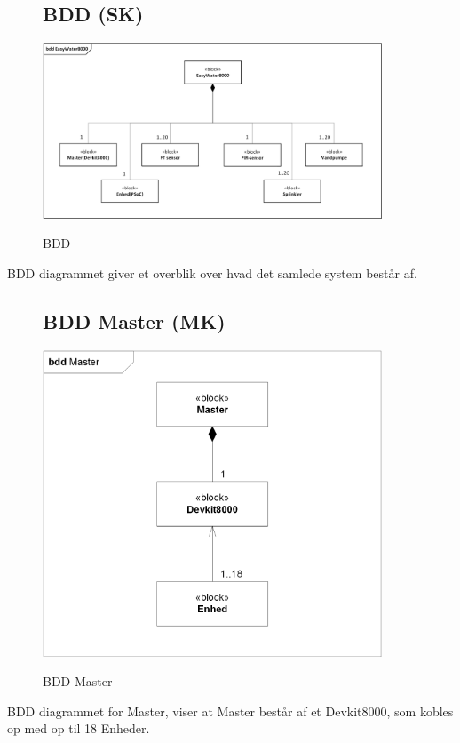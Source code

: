 \begin{figure}[H] \centering
\subsection{BDD (SK)}
{\includegraphics[width=0.9\textwidth]{filer/systemarkitektur/BDD}}
\caption{BDD}
\label{lab:bdd}
\raggedright
\end{figure}
BDD diagrammet giver et overblik over hvad det samlede system består af. \newline \newline

\begin{figure}[H] \centering
\subsection{BDD Master (MK)}
{\includegraphics[width=0.9\textwidth]{filer/systemarkitektur/BDD_Master}}
\caption{BDD Master}
\label{lab:bddmaster}
\raggedright
\end{figure}
BDD diagrammet for Master, viser at Master består af et Devkit8000, som kobles op med op til 18 Enheder.

